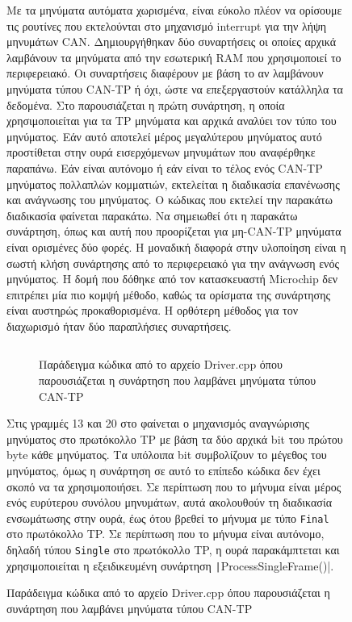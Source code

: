 \documentclass[a4paper,nobib,justified]{tufte-book}
\begin{document}
\begin{figure}

Με τα μηνύματα αυτόματα χωρισμένα, είναι εύκολο πλέον να ορίσουμε τις ρουτίνες που εκτελούνται στο μηχανισμό interrupt για την λήψη μηνυμάτων CAN. Δημιουργήθηκαν δύο συναρτήσεις οι οποίες αρχικά λαμβάνουν τα μηνύματα από την εσωτερική RAM που χρησιμοποιεί το περιφερειακό. Οι συναρτήσεις διαφέρουν με βάση το αν λαμβάνουν μηνύματα τύπου CAN-TP ή όχι, ώστε να επεξεργαστούν κατάλληλα τα δεδομένα. Στο  παρουσιάζεται η πρώτη συνάρτηση, η οποία χρησιμοποιείται για τα TP μηνύματα και αρχικά αναλύει τον τύπο του μηνύματος. Εάν αυτό αποτελεί μέρος μεγαλύτερου μηνύματος αυτό  προστίθεται στην ουρά εισερχόμενων μηνυμάτων που αναφέρθηκε παραπάνω. Εάν είναι αυτόνομο ή εάν είναι το τέλος ενός CAN-TP μηνύματος πολλαπλών κομματιών, εκτελείται η διαδικασία επανένωσης και ανάγνωσης του μηνύματος. Ο κώδικας που εκτελεί την παρακάτω διαδικασία φαίνεται παρακάτω. Να σημειωθεί ότι η παρακάτω συνάρτηση, όπως και αυτή που προορίζεται για μη-CAN-TP μηνύματα είναι ορισμένες δύο φορές. Η μοναδική διαφορά στην υλοποίηση είναι η σωστή κλήση συνάρτησης από το περιφερειακό για την ανάγνωση ενός μηνύματος. Η δομή που δόθηκε από τον κατασκευαστή Microchip δεν επιτρέπει μία πιο κομψή μέθοδο, καθώς τα ορίσματα της συνάρτησης είναι αυστηρώς προκαθορισμένα. Η ορθότερη μέθοδος για τον διαχωρισμό ήταν δύο παραπλήσιες συναρτήσεις.

\begin{figure}
	\inputminted{c++}{code/examples/driver-tp-message-receiver.cpp}
	\label{code:driver-tp-message-receiver}
	\caption[Η συνάρτηση που λαμβάνει μηνύματα τύπου CAN-TP]{Παράδειγμα κώδικα από το αρχείο Driver.cpp όπου παρουσιάζεται η συνάρτηση που λαμβάνει μηνύματα τύπου CAN-TP}
\end{figure}
\FloatBarrier

Στις γραμμές 13 και 20 στο  φαίνεται ο μηχανισμός αναγνώρισης μηνύματος στο πρωτόκολλο TP με βάση τα δύο αρχικά bit του πρώτου byte κάθε μηνύματος. Τα υπόλοιπα bit συμβολίζουν το μέγεθος του μηνύματος, όμως η συνάρτηση σε αυτό το επίπεδο κώδικα δεν έχει σκοπό να τα χρησιμοποιήσει. Σε περίπτωση που το μήνυμα είναι μέρος ενός ευρύτερου συνόλου μηνυμάτων, αυτά ακολουθούν τη διαδικασία ενσωμάτωσης στην ουρά, έως ότου βρεθεί το μήνυμα με τύπο \texttt{Final} στο πρωτόκολλο TP. Σε περίπτωση που το μήνυμα είναι αυτόνομο, δηλαδή τύπου \texttt{Single} στο πρωτόκολλο TP, η ουρά παρακάμπτεται και χρησιμοποιείται η εξειδικευμένη συνάρτηση \texttt|ProcessSingleFrame()|.


\end{figure}
\end{document}
